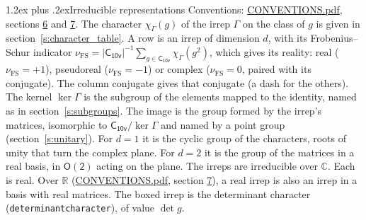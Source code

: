 \documentclass[10pt,a4paper]{article}
\makeatletter
\renewcommand\section{\@startsection{section}{1}{\z@}{-3ex plus -1ex minus -.2ex}%
  {1.2ex plus .2ex}{\normalfont\large\sffamily\bfseries\color{parttitle}}}
\numberwithin{equation}{section}
\newcommand{\grp}[1]{\mathsf{#1}}
\newcommand{\irchar}[1]{\chi_{#1}}
\newcommand{\fsind}{\nu_{\mathrm{FS}}}
\makeatother
\begin{document}
\section{Irreducible representations}\label{s:irreps}
Conventions: \href{../../CONVENTIONS.pdf}{CONVENTIONS.pdf}, sections \href{../../CONVENTIONS.pdf\#conv.6}{6} and \href{../../CONVENTIONS.pdf\#conv.7}{7}.
\leavevmode\label{n:function.character}\label{n:irrep.Gamma}The character $\irchar{\Gamma}(g)$ of the irrep $\Gamma$ on the class of $g$ is given in section~\ref{s:character_table}.
\leavevmode\label{n:index.dimension}\label{n:index.frobenius}\label{n:head.irrep}\label{n:head.reality}A row is an irrep of dimension $d$, with its Frobenius--Schur indicator $\fsind = |\grp{C_{10v}}|^{-1}\allowbreak\sum_{g\in\grp{C_{10v}}}\irchar{\Gamma}(g^2)$, which gives its reality: real ($\fsind = +1$), pseudoreal ($\fsind = -1$) or complex ($\fsind = 0$, paired with its conjugate). \label{n:head.conjugate}The column conjugate gives that conjugate (a dash for the others). \label{n:head.kernel}The kernel $\ker\Gamma$ is the subgroup of the elements mapped to the identity, named as in section~\ref{s:subgroups}. \label{n:head.image}The image is the group formed by the irrep's matrices, isomorphic to $\grp{C_{10v}}/\ker\Gamma$ and named by a point group (section~\ref{s:unitary}). For $d = 1$ it is the cyclic group of the characters, roots of unity that turn the complex plane. For $d = 2$ it is the group of the matrices in a real basis, in $\grp{O(2)}$ acting on the plane. The irreps are irreducible over $\mathbb{C}$. Each is real. Over $\mathbb{R}$ (\href{../../CONVENTIONS.pdf}{CONVENTIONS.pdf}, section \href{../../CONVENTIONS.pdf\#conv.7}{7}), a real irrep is also an irrep in a basis with real matrices. \label{n:mark.determinant}The boxed irrep is the determinant character (\texttt{determinantcharacter}), of value $\det g$.
\setlength{\emergencystretch}{2em}\par\setlength{\emergencystretch}{0pt}
\end{document}
